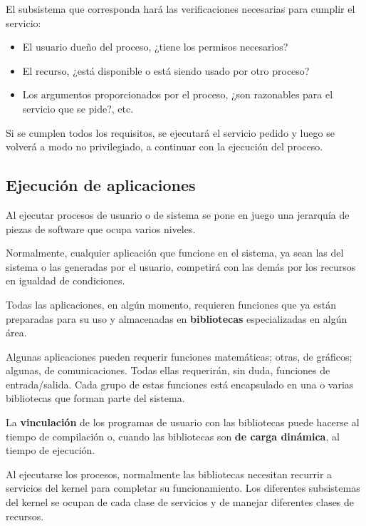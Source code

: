 \documentclass[spanish,a4paper,]{article}
\providecommand{\tightlist}{%
  \setlength{\itemsep}{0pt}\setlength{\parskip}{0pt}}
\begin{document}
El subsistema que corresponda hará las verificaciones necesarias para
cumplir el servicio:

\begin{itemize}
\tightlist
\item
  El usuario dueño del proceso, ¿tiene los permisos necesarios?
\item
  El recurso, ¿está disponible o está siendo usado por otro proceso?
\item
  Los argumentos proporcionados por el proceso, ¿son razonables para el
  servicio que se pide?, etc.
\end{itemize}

Si se cumplen todos los requisitos, se ejecutará el servicio pedido y
luego se volverá a modo no privilegiado, a continuar con la ejecución
del proceso.

\hypertarget{ejecuciuxf3n-de-aplicaciones}{%
\subsection{Ejecución de
aplicaciones}\label{ejecuciuxf3n-de-aplicaciones}}

Al ejecutar procesos de usuario o de sistema se pone en juego una
jerarquía de piezas de software que ocupa varios niveles.

Normalmente, cualquier aplicación que funcione en el sistema, ya sean
las del sistema o las generadas por el usuario, competirá con las demás
por los recursos en igualdad de condiciones.

Todas las aplicaciones, en algún momento, requieren funciones que ya
están preparadas para su uso y almacenadas en \textbf{bibliotecas}
especializadas en algún área.

Algunas aplicaciones pueden requerir funciones matemáticas; otras, de
gráficos; algunas, de comunicaciones. Todas ellas requerirán, sin duda,
funciones de entrada/salida. Cada grupo de estas funciones está
encapsulado en una o varias bibliotecas que forman parte del sistema.

La \textbf{vinculación} de los programas de usuario con las bibliotecas
puede hacerse al tiempo de compilación o, cuando las bibliotecas son
\textbf{de carga dinámica}, al tiempo de ejecución.

Al ejecutarse los procesos, normalmente las bibliotecas necesitan
recurrir a servicios del kernel para completar su funcionamiento. Los
diferentes subsistemas del kernel se ocupan de cada clase de servicios y
de manejar diferentes clases de recursos.
\end{document}
